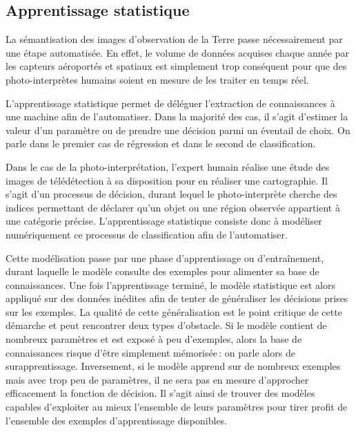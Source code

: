 \subsection{Apprentissage statistique}

La sémantisation des images d'observation de la Terre passe nécessairement par une étape automatisée. En effet, le volume de données acquises chaque année par les capteurs aéroportés et spatiaux est simplement trop conséquent pour que des photo-interprètes humains soient en mesure de les traiter en temps réel.

L'apprentissage statistique permet de déléguer l'extraction de connaissances à une machine afin de l'automatiser. Dans la majorité des cas, il s'agit d'estimer la valeur d'un paramètre ou de prendre une décision parmi un éventail de choix. On parle dans le premier cas de régression et dans le second de classification.

Dans le cas de la photo-interprétation, l'expert humain réalise une étude des images de télédétection à sa disposition pour en réaliser une cartographie. Il s'agit d'un processus de décision, durant lequel le photo-interprète cherche des indices permettant de déclarer qu'un objet ou une région observée appartient à une catégorie précise. L'apprentissage statistique consiste donc à modéliser numériquement ce processus de classification afin de l'automatiser.

Cette modélisation passe par une phase d'apprentissage ou d'entraînement, durant laquelle le modèle consulte des exemples pour alimenter sa base de connaissances. Une fois l'apprentissage terminé, le modèle statistique est alors appliqué sur des données inédites afin de tenter de généraliser les décisions prises sur les exemples. La qualité de cette généralisation est le point critique de cette démarche et peut rencontrer deux types d'obstacle. Si le modèle contient de nombreux paramètres et est exposé à peu d'exemples, alors la base de connaissances risque d'être simplement mémorisée\,: on parle alors de surapprentissage. Inversement, si le modèle apprend sur de nombreux exemples mais avec trop peu de paramètres, il ne sera pas en mesure d'approcher efficacement la fonction de décision. Il s'agit ainsi de trouver des modèles capables d'exploiter au mieux l'ensemble de leurs paramètres pour tirer profit de l'ensemble des exemples d'apprentissage disponibles.

